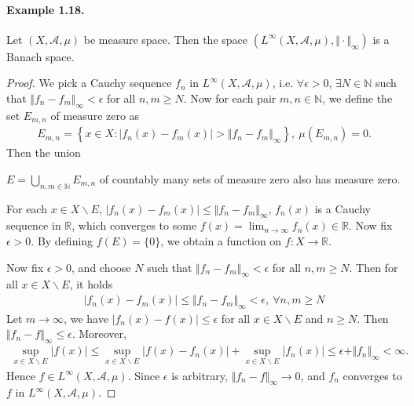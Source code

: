 \documentclass{article}
\begin{document}
\paragraph{Example 1.18.\label{example:1.18}} Let $(X,\mathscr{A},\mu)$ be measure space. Then the space $(L^\infty(X,\mathscr{A},\mu),\Vert\cdot\Vert_\infty)$ is a Banach space.
\begin{proof}
We pick a Cauchy sequence $f_n$ in $L^\infty(X,\mathscr{A},\mu)$, i.e. $\forall \epsilon>0$, $\exists N\in\mathbb{N}$ such that $\Vert f_n-f_m\Vert_\infty <\epsilon$ for all $n,m\geq N$. Now for each pair $m,n\in\mathbb{N}$, we define the set $E_{m,n}$ of measure zero as
\begin{align*}
	E_{m,n}=\left\{x\in X: \vert f_n(x) - f_m(x)\vert > \Vert f_n - f_m\Vert_\infty\right\},\ \mu(E_{m,n})=0.
\end{align*}
Then the union

\vspace{0.30cm}
$\displaystyle E=\bigcup_{n,m\in\mathbb{N}} E_{m,n}$\quad
\vspace{0.30cm}
of countably many sets of measure zero also has measure zero. 

For each $x\in X\backslash E$, $\vert f_n(x)-f_m(x)\vert\leq\Vert f_n-f_m\Vert_\infty$, $f_n(x)$ is a Cauchy sequence in $\mathbb{R}$, which converges to some $f(x)=\lim_{n\to\infty} f_n(x)\in\mathbb{R}$. Now fix $\epsilon >0$. By defining $f(E)=\{0\}$, we obtain a function on $f:X\to\mathbb{R}$.

Now fix $\epsilon >0$, and choose $N$ such that $\Vert f_n - f_m\Vert_\infty < \epsilon$ for all $n,m\geq N$. Then for all $x\in X\backslash E$, it holds
\begin{align*}
	\vert f_n(x) - f_m(x)\vert\leq \Vert f_n - f_m\Vert_\infty < \epsilon,\ \forall n,m\geq N
\end{align*}
Let $m\to\infty$, we have $\vert f_n(x)-f(x)\vert\leq \epsilon$ for all $x\in X\backslash E$ and $n\geq N$. Then $\Vert f_n-f\Vert_\infty \leq \epsilon$. Moreover,
\begin{align*}
	\sup_{x\in X\backslash E} \vert f(x)\vert\leq \sup_{x\in X\backslash E} \vert f(x)-f_n(x)\vert + \sup_{x\in X\backslash E} \vert f_n(x)\vert \leq \epsilon + \Vert f_n\Vert_\infty < \infty.
\end{align*}
Hence $f\in L^\infty(X,\mathscr{A},\mu)$. Since $\epsilon$ is arbitrary, $\Vert f_n-f\Vert_\infty\to 0$, and $f_n$ converges to $f$ in $L^\infty(X,\mathscr{A},\mu)$.
\end{proof}
\end{document}
